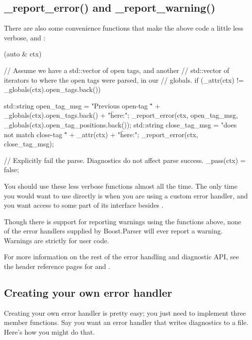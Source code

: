 \documentclass{MyBook}
\begin{document}
\subsection{\_report\_error() and \_report\_warning()}

There are also some convenience functions that make the above code a little less verbose,  and :

\begin{code}
[](auto & ctx) {
    // Assume we have a std::vector of open tags, and another
    // std::vector of iterators to where the open tags were parsed, in our
    // globals.
    if (_attr(ctx) != _globals(ctx).open_tags.back()) {
        std::string open_tag_msg =
            "Previous open-tag \"" + _globals(ctx).open_tags.back() + "\" here:";
        _report_error(ctx, open_tag_msg, _globals(ctx).open_tag_positions.back());
        std::string close_tag_msg =
            "does not match close-tag \"" + _attr(ctx) + "\" here:";
        _report_error(ctx, close_tag_msg);

        // Explicitly fail the parse.  Diagnostics do not affect parse success.
        _pass(ctx) = false;
    }
}
\end{code}

You should use these less verbose functions almost all the time. The only time you would want to use  directly is when you are using a custom error handler, and you want access to some part of its interface besides .

Though there is support for reporting warnings using the functions above, none of the error handlers supplied by Boost.Parser will ever report a warning. Warnings are strictly for user code.

For more information on the rest of the error handling and diagnostic API, see the header reference pages for  and .

\subsection{Creating your own error handler}

Creating your own error handler is pretty easy; you just need to implement three member functions. Say you want an error handler that writes diagnostics to a file. Here's how you might do that.
\end{document}

